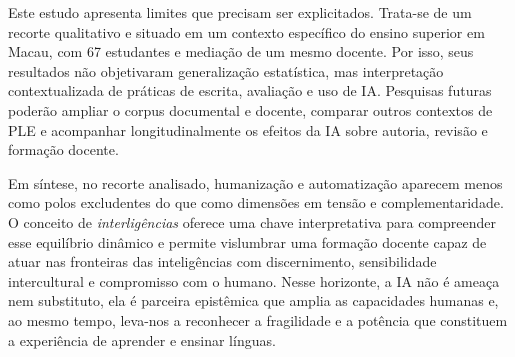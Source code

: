 \documentclass[portuguese]{textolivre}
\begin{document}
Este estudo apresenta limites que precisam ser explicitados. Trata-se de um recorte qualitativo e situado em um contexto específico do ensino superior em Macau, com 67 estudantes e mediação de um mesmo docente. Por isso, seus resultados não objetivaram generalização estatística, mas interpretação contextualizada de práticas de escrita, avaliação e uso de IA. Pesquisas futuras poderão ampliar o corpus documental e docente, comparar outros contextos de PLE e acompanhar longitudinalmente os efeitos da IA sobre autoria, revisão e formação docente.

Em síntese, no recorte analisado, humanização e automatização aparecem menos como polos excludentes do que como dimensões em tensão e complementaridade. O conceito de \textit{interligências} oferece uma chave interpretativa para compreender esse equilíbrio dinâmico e permite vislumbrar uma formação docente capaz de atuar nas fronteiras das inteligências com discernimento, sensibilidade intercultural e compromisso com o humano. Nesse horizonte, a IA não é ameaça nem substituto, ela é parceira epistêmica que amplia as capacidades humanas e, ao mesmo tempo, leva-nos a reconhecer a fragilidade e a potência que constituem a experiência de aprender e ensinar línguas.



\printbibliography\label{sec-bib}


\begin{dataavailability}
\end{dataavailability}


\end{document}
